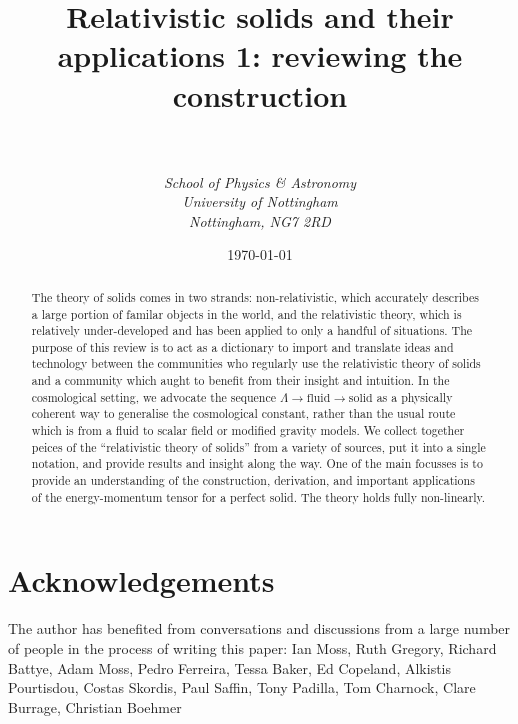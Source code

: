 \documentclass[a4paper, 12pt]{article}
\numberwithin{equation}{section}
\begin{document}
\title{\sc Relativistic solids and their applications 1: reviewing the construction}
\author{\\ \\ \it{School of Physics \& Astronomy} \\ \it{University of Nottingham} \\ \it{Nottingham, NG7 2RD} }

\date{\today}



\maketitle
\begin{abstract}
The theory of solids comes in two   strands: non-relativistic, which accurately describes a large portion of familar objects in the world, and the relativistic theory, which is relatively under-developed and has been applied to only a   handful of situations. The purpose of this review is to act as a dictionary to import and translate   ideas and technology between the communities who regularly use the relativistic theory of solids and a community which aught to benefit from their insight and intuition. In the cosmological setting, we advocate the sequence $\Lambda \rightarrow \mbox{fluid} \rightarrow \mbox{solid}$ as a physically coherent way to generalise the cosmological constant, rather than the usual route which is from a fluid to scalar field or modified gravity models. We collect together peices of the ``relativistic theory of solids'' from a variety of sources, put it into a single notation, and provide results and insight along the way. One of the main focusses is to provide an understanding of the construction, derivation, and important applications of the energy-momentum tensor for a perfect solid. The theory holds fully non-linearly.
\end{abstract}
\clearpage
\tableofcontents
\clearpage

\section*{Acknowledgements}
The author has benefited from  conversations and discussions from a large number of people in the process of writing this paper: Ian Moss, Ruth Gregory, Richard Battye, Adam Moss, Pedro Ferreira, Tessa Baker, Ed Copeland, Alkistis Pourtisdou, Costas Skordis, Paul Saffin, Tony Padilla, Tom Charnock, Clare Burrage, Christian Boehmer
{}


\end{document}
